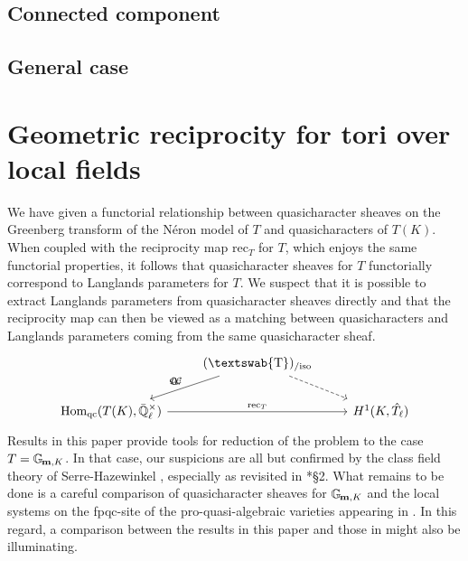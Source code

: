 \documentclass{amsart}
\theoremstyle{plain}
\theoremstyle{definition}
\theoremstyle{remark}
\newcommand{\EE}{\mathbb{\bar Q}_\ell}
\newcommand{\EEx}{\EE^\times}
\newcommand{\mathswab}[1]{\operatorname{\textswab{#1}}}
\newcommand{\Gm}[1]{\mathbb{G}_{\hskip-1pt\textbf{m},#1}}
\newcommand{\GN}[1]{\mathswab{#1}}
\DeclareMathOperator{\Hom}{Hom}
\newcommand{\QC}{{\mathcal{Q\hskip-0.8pt C}}}
\newcommand{\QCiso}[1]{\QC(#1)_{/\text{iso}}}
\newcommand{\trFrob}[1]{t_{#1}}
\begin{document}
\subsection{Connected component}


\subsection{General case}


\section{Geometric reciprocity for tori over local fields}
\label{sec:reciprocity}

We have given a functorial relationship between quasicharacter sheaves
on the Greenberg transform of the Néron model of $T$
and quasicharacters of $T(K)$.
When coupled with the reciprocity map $\text{rec}_T $ for $T$,
which enjoys the same functorial properties,
it follows that quasicharacter sheaves for $T$
functorially correspond to Langlands parameters for $T$.
We suspect that it is possible to extract Langlands parameters
from quasicharacter sheaves directly and that the reciprocity map
can then be viewed as a matching between quasicharacters and Langlands parameters coming
 from the same quasicharacter sheaf.
 \[
\begin{tikzcd}
\ & \arrow[swap]{dl}{\trFrob{G}} \QCiso{\GN{T}} \arrow[dashed]{dr} & \\
\Hom_{\text{qc}}(T(K),\EEx) \arrow{rr}{\text{rec}_T} && H^1(K,\hat{T}_\ell)
\end{tikzcd}
\]
 Results in this paper provide tools for reduction of the problem to the case $T=\Gm{K}$.
 In that case, our suspicions are all but confirmed
 by the class field theory of Serre-Hazewinkel
 ,
 especially as revisited in \cite{suzuki-yoshida:12a}*{\S 2}.
 What remains to be done is a careful comparison of
 quasicharacter sheaves for $\Gm{K}$ and the local systems on
  the fpqc-site of the pro-quasi-algebraic varieties appearing in \cite{suzuki-yoshida:12a}.
In this regard, a comparison between the results in this paper and those in \cite{cunningham-kamgarpour:geometrization} might also be illuminating.








\end{document}
